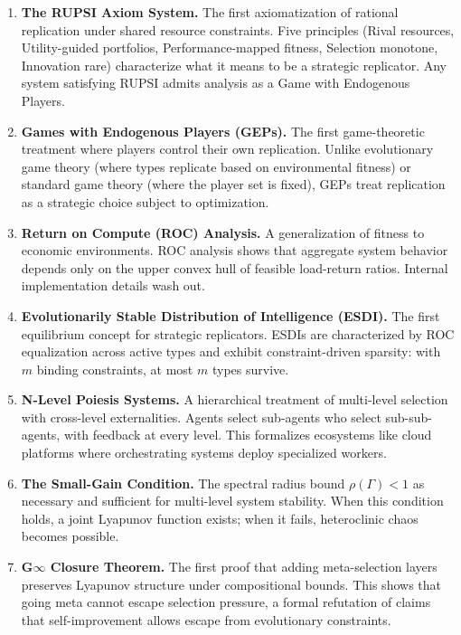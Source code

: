 \documentclass[12pt]{article}
\begin{document}
\begin{enumerate}
\item \textbf{The RUPSI Axiom System.} The first axiomatization of rational replication under shared resource constraints. Five principles (Rival resources, Utility-guided portfolios, Performance-mapped fitness, Selection monotone, Innovation rare) characterize what it means to be a strategic replicator. Any system satisfying RUPSI admits analysis as a Game with Endogenous Players.

\item \textbf{Games with Endogenous Players (GEPs).} The first game-theoretic treatment where players control their own replication. Unlike evolutionary game theory (where types replicate based on environmental fitness) or standard game theory (where the player set is fixed), GEPs treat replication as a strategic choice subject to optimization.

\item \textbf{Return on Compute (ROC) Analysis.} A generalization of fitness to economic environments. ROC analysis shows that aggregate system behavior depends only on the upper convex hull of feasible load-return ratios. Internal implementation details wash out.

\item \textbf{Evolutionarily Stable Distribution of Intelligence (ESDI).} The first equilibrium concept for strategic replicators. ESDIs are characterized by ROC equalization across active types and exhibit constraint-driven sparsity: with $m$ binding constraints, at most $m$ types survive.

\item \textbf{N-Level Poiesis Systems.} A hierarchical treatment of multi-level selection with cross-level externalities. Agents select sub-agents who select sub-sub-agents, with feedback at every level. This formalizes ecosystems like cloud platforms where orchestrating systems deploy specialized workers.

\item \textbf{The Small-Gain Condition.} The spectral radius bound $\rho(\Gamma) < 1$ as necessary and sufficient for multi-level system stability. When this condition holds, a joint Lyapunov function exists; when it fails, heteroclinic chaos becomes possible.

\item \textbf{G$\infty$ Closure Theorem.} The first proof that adding meta-selection layers preserves Lyapunov structure under compositional bounds. This shows that going meta cannot escape selection pressure, a formal refutation of claims that self-improvement allows escape from evolutionary constraints.


\end{enumerate}
\end{document}
